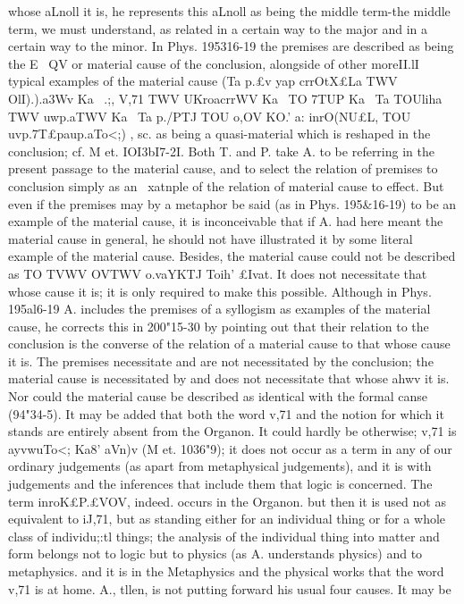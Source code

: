 {{{{{{{{{{{{{{{{{{{{{{{{{{{{{{{{{{{{{{{{{{{{{{{{{{{{{{{{{{whose aLnoll it is, he represents this aLnoll as being the middle
term-the middle term, we must understand, as related in a
certain way to the major and in a certain way to the minor.
In Phys. 195316-19 the premises are described as being the
E~ QV or material cause of the conclusion, alongside of other moreII.lI
typical examples of the material cause (Ta p.£v yap crrOtX£La TWV
OlI).).a{3Wv Ka~ .;, V},71 TWV UKroacrrWV Ka~ TO 7TUP Ka~ Ta TOUliha TWV
uwp.aTWV Ka~ Ta p./PTJ TOU o},OV KO.' a: inrO(NU£L, TOU uvp.7T£paup.aTo<;) ,
sc. as being a quasi-material which is reshaped in the conclusion;
cf. M et. IOI3bI7-2I. Both T. and P. take A. to be referring in the
present passage to the material cause, and to select the relation
of premises to conclusion simply as an ~xatnple of the relation
of material cause to effect. But even if the premises may by
a metaphor be said (as in Phys. 195&16-19) to be an example of
the material cause, it is inconceivable that if A. had here meant
the material cause in general, he should not have illustrated it
by some literal example of the material cause. Besides, the
material cause could not be described as TO T{VWV OVTWV o.vaYKTJ
Toih' £Ivat. It does not necessitate that whose cause it is; it is
only required to make this possible. Although in Phys. 195al6-19
A. includes the premises of a syllogism as examples of the material
cause, he corrects this in 200"15-30 by pointing out that their
relation to the conclusion is the converse of the relation of a
material cause to that whose cause it is. The premises necessitate
and are not necessitated by the conclusion; the material cause is
necessitated by and does not necessitate that whose ahwv it is.
Nor could the material cause be described as identical with the
formal canse (94"34-5). It may be added that both the word
v},71 and the notion for which it stands are entirely absent from
the Organon. It could hardly be otherwise; v},71 is ayvwuTo<; Ka8'
aVn)v (M et. 1036"9); it does not occur as a term in any of our
ordinary judgements (as apart from metaphysical judgements),
and it is with judgements and the inferences that include them
that logic is concerned. The term inroK£{P.£VOV, indeed. occurs in
the Organon. but then it is used not as equivalent to iJ},71, but as
standing either for an individual thing or for a whole class of
individu;:tl things; the analysis of the individual thing into matter
and form belongs not to logic but to physics (as A. understands
physics) and to metaphysics. and it is in the Metaphysics and the
physical works that the word v},71 is at home.
A., tllen, is not putting forward his usual four causes. It may be
}}}}}}}}}}}}}}}}}}}}}}}}}}}}}}}}}}}}}}}}}}}}}}}}}}}}}}}
